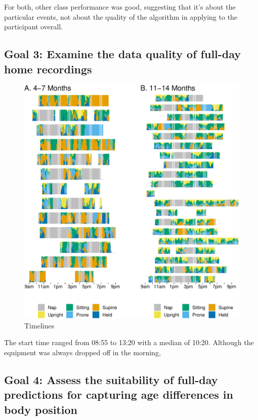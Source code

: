 \documentclass[
  man]{apa6}
\begin{document}
For both, other class performance was good, suggesting that it's about the particular events, not about the quality of the algorithm in applying to the participant overall.

\hypertarget{goal-3-examine-the-data-quality-of-full-day-home-recordings}{%
\subsection{Goal 3: Examine the data quality of full-day home recordings}\label{goal-3-examine-the-data-quality-of-full-day-home-recordings}}

\begin{figure}

{\centering \includegraphics{manuscript_files/figure-latex/timelines-1} 

}

\caption{Timelines}\label{fig:timelines}
\end{figure}

The start time ranged from 08:55 to 13:20 with a median of 10:20. Although the equipment was always dropped off in the morning,

\hypertarget{goal-4-assess-the-suitability-of-full-day-predictions-for-capturing-age-differences-in-body-position}{%
\subsection{Goal 4: Assess the suitability of full-day predictions for capturing age differences in body position}\label{goal-4-assess-the-suitability-of-full-day-predictions-for-capturing-age-differences-in-body-position}}
\end{document}
